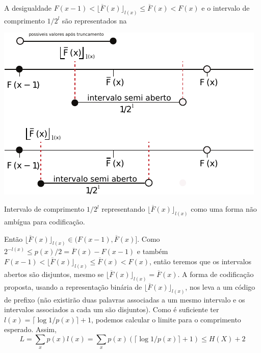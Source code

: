 A desigualdade $F(x-1) < \lfloor \overline{F}(x) \rfloor_{l(x)} \leq \overline{F}(x) < F(x)$ e o intervalo de comprimento $1/2^l$ são representados na
\begin{marginfigure}%
  \includegraphics[width=\linewidth]{figures/intervalshannonfanoelias.pdf}
  \caption{Intervalo de comprimento $1/2^l$ representando $\lfloor \overline{F}(x) \rfloor_{l(x)}$ como uma forma não ambígua para codificação.}\label{fig:intervalshannonfanoelias}
\end{marginfigure}
Então $\lfloor \overline{F}(x) \rfloor_{l(x)} \in (F(x-1), \overline{F}(x)]$.
Como $2^{-l(x)} \leq p(x)/2 = \overline{F}(x) - F(x-1)$  e também $F(x-1) < \lfloor \overline{F}(x) \rfloor_{l(x)} \leq \overline{F}(x) < F(x)$, então
teremos que os intervalos abertos são disjuntos, mesmo se $\lfloor \overline{F}(x) \rfloor_{l(x)} = \overline{F}(x)$.
A forma de codificação proposta, usando a representação binária de $\lfloor \overline{F}(x) \rfloor_{l(x)}$, 
nos leva a um código de prefixo (não existirão duas palavras associadas a um mesmo intervalo e os intervalos associados a cada um são disjuntos).
Como é suficiente ter $l(x) = \lceil \log 1/p(x) \rceil + 1$, podemos calcular o limite para o comprimento esperado.
Assim,
\begin{equation}
 L = \sum_{x} p(x) l(x) = \sum_{x} p(x) (\lceil \log 1 / p(x) \rceil + 1) \leq H(X) + 2
\end{equation}


